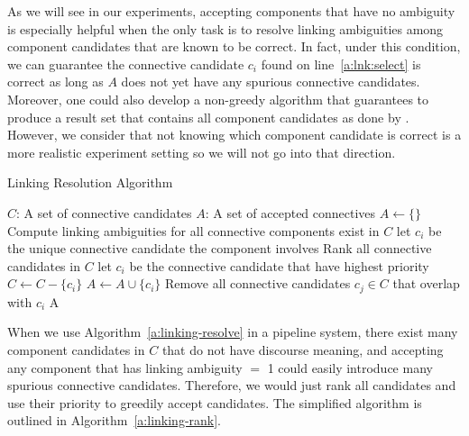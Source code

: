 As we will see in our experiments, accepting components that have no ambiguity
is especially helpful when the only task is to resolve linking ambiguities among
component candidates that are known to be correct.
In fact, under this condition, we can guarantee the connective candidate
$c_i$ found on line~\ref{a:lnk:select} is correct as long as $A$ does not yet have
any spurious connective candidates. Moreover, one could also develop a non-greedy
algorithm that guarantees to produce a result set that contains all component
candidates as done by \cite{hu2011research}. However, we consider that not knowing
which component candidate is correct is a more realistic experiment setting so
we will not go into that direction.

\begin{algorithm}
    \caption{Linking Resolution Algorithm}
    \label{a:linking-resolve}
    \begin{algorithmic}[1]
        \Require
            $C$: A set of connective candidates
        \Ensure
            $A$: A set of accepted connectives
        \State $A \gets \{\}$
            \State Compute linking ambiguities for all connective components exist in $C$ \label{a:lnk:compute}
             \label{a:lnk:check}
                \State let $ c_i $ be the unique connective candidate the component involves \label{a:lnk:select}
            \Else
                \State Rank all connective candidates in $ C $
                \State let $ c_i $ be the connective candidate that have highest priority
            \EndIf
                \State $C \gets C - \{c_i\}$
                \State $A \gets A \cup \{c_i\}$
            \State Remove all connective candidates $ c_j \in C $ that overlap with $ c_i $
        \EndWhile
        \State \Return A
    \end{algorithmic}
\end{algorithm}

When we use Algorithm~\ref{a:linking-resolve} in a pipeline system,
there exist many component candidates in $C$ that do not have discourse meaning,
and accepting any component that has linking ambiguity $=$ 1 could easily
introduce many spurious connective candidates. Therefore, we would just rank all
candidates and use their priority to greedily accept candidates. The simplified
algorithm is outlined in Algorithm~\ref{a:linking-rank}.

